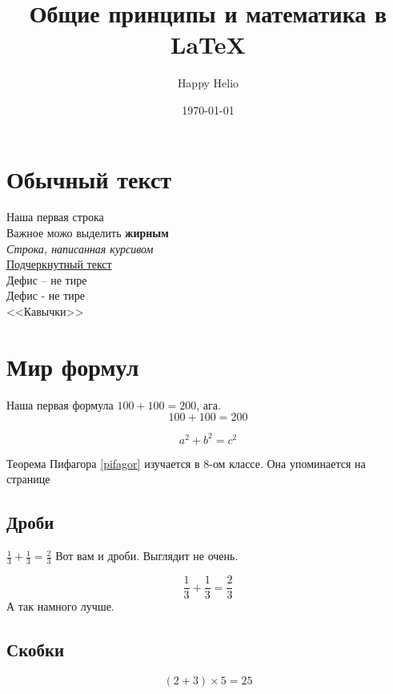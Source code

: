 \documentclass[a4paper,12pt]{article}
\author{Happy Helio}
\title{Общие принципы и математика в \LaTeX{}}
\date{\today}
\begin{document}
\maketitle
\newpage

\section{Обычный текст}

Наша первая строка \\ 
Важное можо выделить \textbf{жирным} \\
\textit{Строка, написанная курсивом} \\
\underline{Подчеркнутный текст}
 \\
Дефис -- не тире \\
Дефис -  не тире \\
<<Кавычки>>

\section{Мир формул}

Наша первая формула $100+100=200$, ага.
\[100+100=200\] %

\begin{equation}\label{pifagor}
a^2+b^2=c^2
\end{equation}

Теорема Пифагора \eqref{pifagor} изучается в 8-ом классе. 
Она упоминается на странице \pageref{pifagor}

\subsection{Дроби} 


$\frac{1}{3}+\frac{1}{3}=\frac{2}{3}$ Вот вам и дроби. Выглядит не очень.

\[\frac{1}{3}+\frac{1}{3}=\frac{2}{3}\]
А так намного лучше.

\subsection{Скобки}

\[ (2+3)\times 5=25\]
\end{document}
